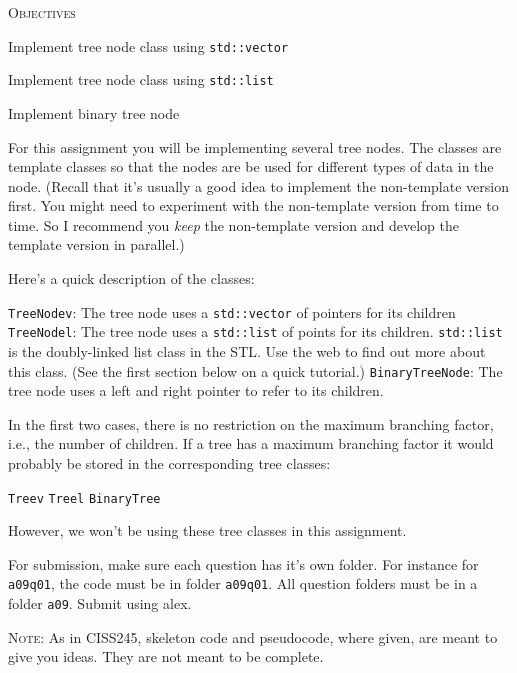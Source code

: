 \textsc{Objectives}
\begin{tightlist}
\item Implement tree node class using \verb!std::vector!
\item Implement tree node class using \verb!std::list!
\item Implement binary tree node
\end{tightlist}

For this assignment you will be implementing several tree nodes.
The classes are template classes so that the nodes are be used for
different types of data in the node.
(Recall that it's usually a good idea to implement the non-template version
first. You might need to experiment with the non-template version
from time to time. So I recommend you \textit{keep}
the non-template version and develop the template version in parallel.)

Here's a quick description of the classes:
\begin{tightlist}
\li \verb!TreeNodev!: The tree node uses a \verb!std::vector! of pointers
for its children 
\li \verb!TreeNodel!: The tree node uses a \verb!std::list! of points
for its children.  
\verb!std::list! is the doubly-linked list class in the 
STL.
Use the web to find out more about this class.
(See the first section below on a quick tutorial.)
\li \verb!BinaryTreeNode!: The tree node uses a left and right pointer
to refer to its children.
\end{tightlist} 

In the first two cases, 
there is no restriction on the maximum branching factor, i.e., 
the number of children.
If a tree has a maximum branching factor it 
would probably be stored in the corresponding tree classes:
\begin{tightlist}
\li \verb!Treev!
\li \verb!Treel!
\li \verb!BinaryTree!
\end{tightlist}
However, we won't be using these tree classes in this assignment.

For submission, make sure each question has it's own folder.
For instance for \verb!a09q01!, 
the code must be in folder \verb!a09q01!.
All question folders must be in a folder \verb!a09!.
Submit using alex.

\textsc{Note}: As in CISS245, skeleton code and pseudocode, where given,
are meant to give you ideas. They are not meant to be complete.
